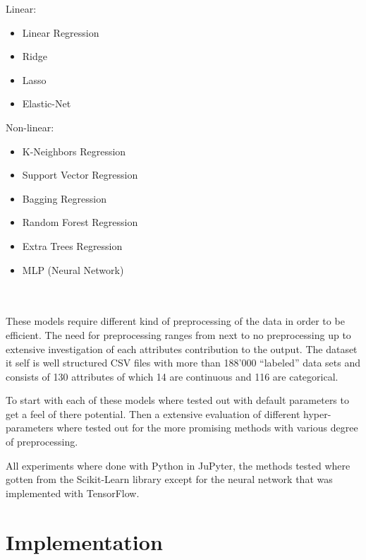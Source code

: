 \documentclass[a4paper]{article}
\begin{document}
\begin{varwidth}[t]{.5\textwidth}
    Linear:
    \begin{itemize}
        \item Linear Regression
        \item Ridge
        \item Lasso
        \item Elastic-Net
    \end{itemize}
\end{varwidth}
\hspace{4em}
\begin{varwidth}[t]{.5\textwidth}
    Non-linear:
    \begin{itemize}
        \item K-Neighbors Regression
        \item Support Vector Regression
        \item Bagging Regression
        \item Random Forest Regression
        \item Extra Trees Regression
        \item MLP (Neural Network)
    \end{itemize}
\end{varwidth} \\\\
These models require different kind of preprocessing of the data in order to be efficient. The need for preprocessing ranges from next to no preprocessing up to extensive investigation of each attributes contribution to the output. The dataset it self is well structured CSV files with more than 188’000 “labeled” data sets and consists of 130 attributes of which 14 are continuous and 116 are categorical.

To start with each of these models where tested out with default parameters to get a feel of there potential. Then a extensive evaluation of different hyper-parameters where tested out for the more promising methods with various degree of preprocessing.

All experiments where done with Python in JuPyter, the methods tested where gotten from the Scikit-Learn library except for the neural network that was implemented with TensorFlow.


\section{Implementation}
\end{document}

